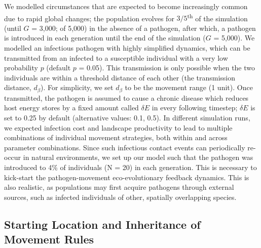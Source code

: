 We modelled circumstances that are expected to become increasingly common due to rapid global changes; the population evolves for $3/5$\textsuperscript{th} of the simulation (until $G$ = 3,000; of 5,000) in the absence of a pathogen, after which, a pathogen is introduced in each generation until the end of the simulation ($G$ = 5,000).
We modelled an infectious pathogen with highly simplified dynamics, which can be transmitted from an infected to a susceptible individual with a very low probability $p$ (default $p$ = 0.05).
This transmission is only possible when the two individuals are within a threshold distance of each other (the transmission distance, $d_\beta$).
For simplicity, we set $d_\beta$ to be the movement range (1 unit).
Once transmitted, the pathogen is assumed to cause a chronic disease which reduces host energy stores by a fixed amount called $\delta E$ in every following timestep; $\delta E$ is set to 0.25 by default (alternative values: 0.1, 0.5).
In different simulation runs, we expected infection cost and landscape productivity to lead to multiple combinations of individual movement strategies, both within and across parameter combinations.
Since such infectious contact events can periodically re-occur in natural environments, we set up our model such that the pathogen was introduced to 4\% of individuals (N = 20) in each generation.
This is necessary to kick-start the pathogen-movement eco-evolutionary feedback dynamics.
This is also realistic, as populations may first acquire pathogens through external sources, such as infected individuals of other, spatially overlapping species.

\subsection*{Starting Location and Inheritance of Movement Rules}

